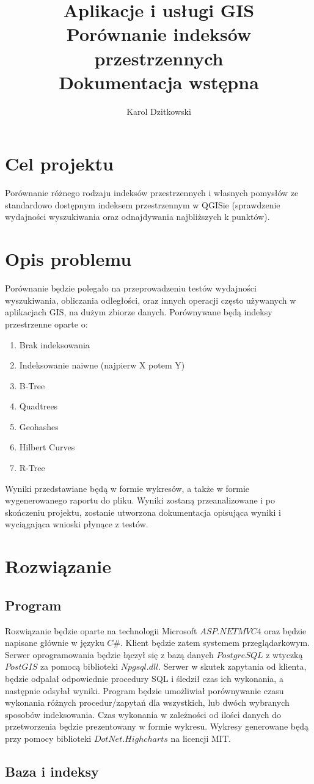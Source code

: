 \documentclass[11pt,a4paper]{article}
\author{Karol Dzitkowski}
\title{
	Aplikacje i usługi GIS\\
	\huge{Porównanie indeksów przestrzennych}\\
 	Dokumentacja wstępna
 }
\begin{document}
\maketitle
\newpage

\tableofcontents
\newpage

\section{Cel projektu}
Porównanie różnego rodzaju indeksów przestrzennych i własnych pomysłów ze standardowo dostępnym indeksem przestrzennym w QGISie
(sprawdzenie wydajności wyszukiwania oraz odnajdywania najbliższych k punktów).
\section{Opis problemu}
Porównanie będzie polegało na przeprowadzeniu testów wydajności wyszukiwania, obliczania odległości, oraz innych operacji często
używanych w aplikacjach GIS, na dużym zbiorze danych. Porównywane będą indeksy przestrzenne oparte o:
\begin{enumerate}
	\item Brak indeksowania
	\item Indeksowanie naiwne (najpierw X potem Y)
	\item B-Tree
	\item Quadtrees
	\item Geohashes
	\item Hilbert Curves
	\item R-Tree
\end{enumerate}
Wyniki przedstawiane będą w formie wykresów, a także w formie wygenerowanego raportu do pliku. Wyniki zostaną przeanalizowane i
po skończeniu projektu, zostanie utworzona dokumentacja opisująca wyniki i wyciągająca wnioski płynące z testów.

\section{Rozwiązanie}
\subsection{Program}
Rozwiązanie będzie oparte na technologii Microsoft $ASP.NET MVC4$ oraz będzie napisane głównie w języku $C\#$. Klient będzie zatem
systemem przeglądarkowym. Serwer oprogramowania będzie łączył się z bazą danych $PostgreSQL$ z wtyczką $PostGIS$ za pomocą biblioteki 
$Npgsql.dll$. Serwer w skutek zapytania od klienta, będzie odpalał odpowiednie procedury SQL i śledził czas ich wykonania, a następnie odsyłał wyniki. 
Program będzie umożliwiał porównywanie czasu wykonania różnych procedur/zapytań dla wszystkich, lub dwóch wybranych sposobów 
indeksowania. Czas wykonania w zależności od ilości danych do przetworzenia będzie prezentowany w formie wykresu. Wykresy 
generowane będą przy pomocy biblioteki $DotNet.Highcharts$ na licencji MIT.

\subsection{Baza i indeksy}
\end{document}

